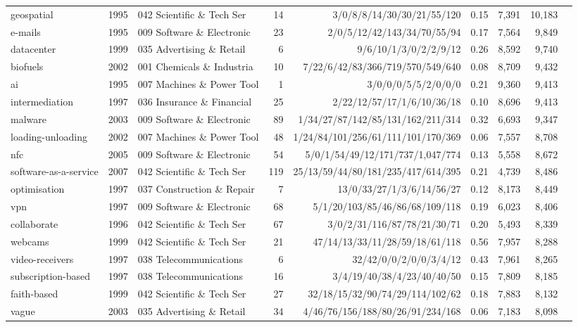 {\begin{tabular}{llp{3.2cm}rrp{3.4cm}rrr}
geospatial & 1995 & 042 Scientific \& Tech Ser & 14 & 3/0/8/8/14/30/30/21/55/120 & 0.15 & 7,391 & 10,183 \\
e-mails & 1995 & 009 Software \& Electronic & 23 & 2/0/5/12/42/143/34/70/55/94 & 0.17 & 7,564 & 9,849 \\
datacenter & 1999 & 035 Advertising \& Retail & 6 & 9/6/10/1/3/0/2/2/9/12 & 0.26 & 8,592 & 9,740 \\
biofuels & 2002 & 001 Chemicals \& Industria & 10 & 7/22/6/42/83/366/719/570/549/640 & 0.08 & 8,709 & 9,432 \\
ai & 1995 & 007 Machines \& Power Tool & 1 & 3/0/0/0/5/5/2/0/0/0 & 0.21 & 9,360 & 9,413 \\
intermediation & 1997 & 036 Insurance \& Financial & 25 & 2/22/12/57/17/1/6/10/36/18 & 0.10 & 8,696 & 9,413 \\
malware & 2003 & 009 Software \& Electronic & 89 & 1/34/27/87/142/85/131/162/211/314 & 0.32 & 6,693 & 9,347 \\
loading-unloading & 2002 & 007 Machines \& Power Tool & 48 & 1/24/84/101/256/61/111/101/170/369 & 0.06 & 7,557 & 8,708 \\
nfc & 2005 & 009 Software \& Electronic & 54 & 5/0/1/54/49/12/171/737/1,047/774 & 0.13 & 5,558 & 8,672 \\
software-as-a-service & 2007 & 042 Scientific \& Tech Ser & 119 & 25/13/59/44/80/181/235/417/614/395 & 0.21 & 4,739 & 8,486 \\
optimisation & 1997 & 037 Construction \& Repair & 7 & 13/0/33/27/1/3/6/14/56/27 & 0.12 & 8,173 & 8,449 \\
vpn & 1997 & 009 Software \& Electronic & 68 & 5/1/20/103/85/46/86/68/109/118 & 0.19 & 6,023 & 8,406 \\
collaborate & 1996 & 042 Scientific \& Tech Ser & 67 & 3/0/2/31/116/87/78/21/30/71 & 0.20 & 5,493 & 8,339 \\
webcams & 1999 & 042 Scientific \& Tech Ser & 21 & 47/14/13/33/11/28/59/18/61/118 & 0.56 & 7,957 & 8,288 \\
video-receivers & 1997 & 038 Telecommunications & 6 & 32/42/0/0/2/0/0/3/4/12 & 0.43 & 7,961 & 8,265 \\
subscription-based & 1997 & 038 Telecommunications & 16 & 3/4/19/40/38/4/23/40/40/50 & 0.15 & 7,809 & 8,185 \\
faith-based & 1999 & 042 Scientific \& Tech Ser & 27 & 32/18/15/32/90/74/29/114/102/62 & 0.18 & 7,883 & 8,132 \\
vague & 2003 & 035 Advertising \& Retail & 34 & 4/46/76/156/188/80/26/91/234/168 & 0.06 & 7,183 & 8,098 \\

\end{tabular}}
